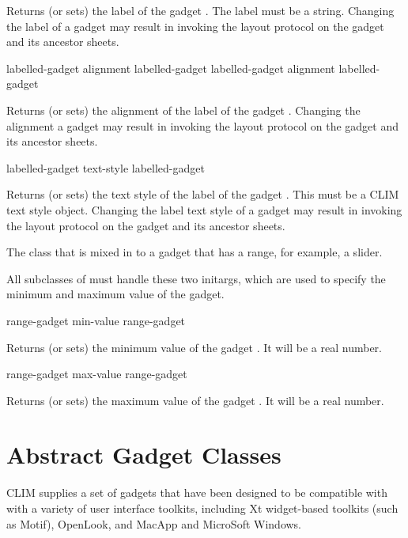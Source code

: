 Returns (or sets) the label of the gadget .  The label must
be a string.  Changing the label of a gadget may result in invoking the layout
protocol on the gadget and its ancestor sheets.

 {labelled-gadget}
 {alignment labelled-gadget}
 {labelled-gadget}
 {alignment labelled-gadget}

Returns (or sets) the alignment of the label of the gadget
.  Changing the alignment a gadget may result in invoking
the layout protocol on the gadget and its ancestor sheets.

 {labelled-gadget}
 {text-style labelled-gadget}

Returns (or sets) the text style of the label of the gadget
.  This must be a CLIM text style object.  Changing the
label text style of a gadget may result in invoking the layout protocol on the
gadget and its ancestor sheets.



The class that is mixed in to a gadget that has a range, for example, a slider.


All subclasses of  must handle these two initargs, which
are used to specify the minimum and maximum value of the gadget.

 {range-gadget}
 {min-value range-gadget}

Returns (or sets) the minimum value of the gadget .  It will be a real
number.

 {range-gadget}
 {max-value range-gadget}

Returns (or sets) the maximum value of the gadget .  It will
be a real number.


\section {Abstract Gadget Classes}

CLIM supplies a set of gadgets that have been designed to be compatible with
with a variety of user interface toolkits, including Xt widget-based toolkits
(such as Motif), OpenLook, and MacApp and MicroSoft Windows.

